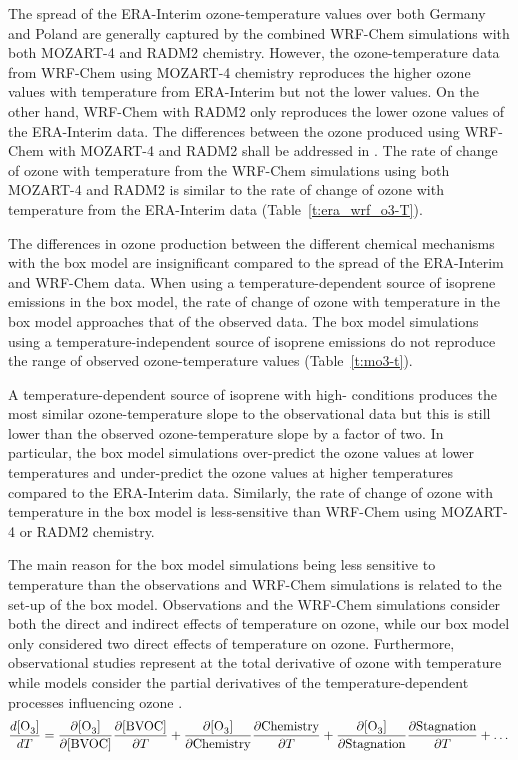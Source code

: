 The spread of the ERA-Interim ozone-temperature values over both Germany and Poland are generally captured by the combined WRF-Chem simulations with both MOZART-4 and RADM2 chemistry. 
However, the ozone-temperature data from WRF-Chem using MOZART-4 chemistry reproduces the higher ozone values with temperature from ERA-Interim but not the lower values.
On the other hand, WRF-Chem with RADM2 only reproduces the lower ozone values of the ERA-Interim data.
The differences between the ozone produced using WRF-Chem with MOZART-4 and RADM2 shall be addressed in \citet{Mar:2015}.
The rate of change of ozone with temperature from the WRF-Chem simulations using both MOZART-4 and RADM2 is similar to the rate of change of ozone with temperature from the ERA-Interim data (Table~\ref{t:era_wrf_o3-T}).

The differences in ozone production between the different chemical mechanisms with the box model are insignificant compared to the spread of the ERA-Interim and WRF-Chem data.
When using a temperature-dependent source of isoprene emissions in the box model, the rate of change of ozone with temperature in the box model approaches that of the observed data.
The box model simulations using a temperature-independent source of isoprene emissions do not reproduce the range of observed ozone-temperature values (Table~\ref{t:mo3-t}).

A temperature-dependent source of isoprene with high- conditions produces the most similar ozone-temperature slope to the observational data but this is still lower than the observed ozone-temperature slope by a factor of two.
In particular, the box model simulations over-predict the ozone values at lower temperatures and under-predict the ozone values at higher temperatures compared to the ERA-Interim data.
Similarly, the rate of change of ozone with temperature in the box model is less-sensitive than WRF-Chem using MOZART-4 or RADM2 chemistry.

The main reason for the box model simulations being less sensitive to temperature than the observations and WRF-Chem simulations is related to the set-up of the box model.
Observations and the WRF-Chem simulations consider both the direct and indirect effects of temperature on ozone, while our box model only considered two direct effects of temperature on ozone.
Furthermore, observational studies represent at the total derivative of ozone with temperature while models consider the partial derivatives of the temperature-dependent processes influencing ozone \citep{Rasmussen:2013}. 
\begin{equation*} 
    \frac{d[\ce{O3}]}{dT} = \frac{\partial [\ce{O3}]}{\partial [\text{BVOC}]}\frac{\partial [\text{BVOC}]}{\partial T} + \frac{\partial [\ce{O3}]}{\partial \text{Chemistry}}\frac{\partial \text{Chemistry}}{\partial T} + \frac{\partial [\ce{O3}]}{\partial \text{Stagnation}}\frac{\partial \text{Stagnation}}{\partial T} + \dots
\end{equation*}

